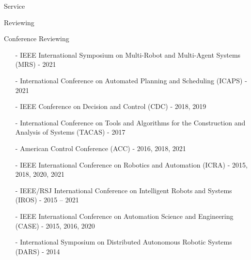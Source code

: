 \begin{rSection}{Service}
\begin{rSubsection}{Reviewing}{}{}{}
\item{Conference Reviewing}
\begin{itemize}
\vspace*{-0.2cm}
\item[-]  IEEE International Symposium on Multi-Robot and Multi-Agent Systems (MRS) - 2021\vspace*{-0.2cm}
\item[-]  International Conference on Automated Planning and Scheduling (ICAPS) - 2021\vspace*{-0.2cm}
\item[-]  IEEE Conference on Decision and Control (CDC) - 2018, 2019\vspace*{-0.2cm}
\item[-]  International Conference on Tools and Algorithms for the Construction and Analysis of Systems (TACAS) - 2017\vspace*{-0.2cm}
\item[-]  American Control Conference (ACC) - 2016, 2018, 2021\vspace*{-0.2cm}
\item[-]  IEEE International Conference on Robotics and Automation (ICRA) - 2015, 2018, 2020, 2021\vspace*{-0.2cm}
\item[-]  IEEE/RSJ International Conference on Intelligent Robots and Systems (IROS) - 2015 -- 2021\vspace*{-0.2cm}
\item[-]  IEEE International Conference on Automation Science and Engineering (CASE) - 2015, 2016, 2020\vspace*{-0.2cm}
\item[-]  International Symposium on Distributed Autonomous Robotic Systems (DARS) - 2014
\end{itemize}


\end{rSubsection}
\end{rSection}
